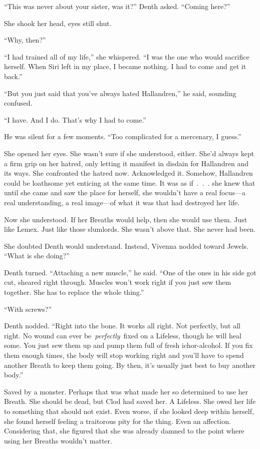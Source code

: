 “This was never about your sister, was it?” Denth asked. “Coming here?”

She shook her head, eyes still shut.

“Why, then?”

“I had trained all of my life,” she whispered. “I was the one who would sacrifice herself. When Siri left in my place, I became nothing. I had to come and get it back.”

“But you just said that you’ve always hated Hallandren,” he said, sounding confused.

“I have. And I do. That’s why I had to come.”

He was silent for a few moments. “Too complicated for a mercenary, I guess.”

She opened her eyes. She wasn’t sure if she understood, either. She’d always kept a firm grip on her hatred, only letting it manifest in disdain for Hallandren and its ways. She confronted the hatred now. Acknowledged it. Somehow, Hallandren could be loathsome yet enticing at the same time. It was as if~.~.~. she knew that until she came and saw the place for herself, she wouldn’t have a real focus—a real understanding, a real image—of what it was that had destroyed her life.

Now she understood. If her Breaths would help, then she would use them. Just like Lemex. Just like those slumlords. She wasn’t above that. She never had been.

She doubted Denth would understand. Instead, Vivenna nodded toward Jewels. “What is she doing?”

Denth turned. “Attaching a new muscle,” he said. “One of the ones in his side got cut, sheared right through. Muscles won’t work right if you just sew them together. She has to replace the whole thing.”

“With screws?”

Denth nodded. “Right into the bone. It works all right. Not perfectly, but all right. No wound can ever be~\textit{perfectly}~fixed on a Lifeless, though he will heal some. You just sew them up and pump them full of fresh ichor-alcohol. If you fix them enough times, the body will stop working right and you’ll have to spend another Breath to keep them going. By then, it’s usually just best to buy another body.”

Saved by a monster. Perhaps that was what made her so determined to use her Breath. She should be dead, but Clod had saved her. A Lifeless. She owed her life to something that should not exist. Even worse, if she looked deep within herself, she found herself feeling a traitorous pity for the thing. Even an affection. Considering that, she figured that she was already damned to the point where using her Breaths wouldn’t matter.

